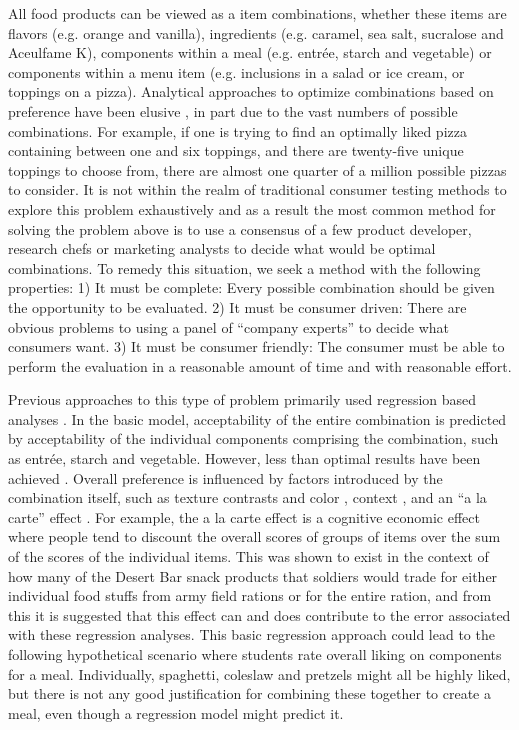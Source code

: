 All food products can be viewed as a item combinations, whether these items are flavors (e.g. orange and vanilla),  ingredients (e.g. caramel, sea salt, sucralose and Aceulfame K), components within a meal (e.g. entr\'{e}e, starch and vegetable) or components within a menu item (e.g. inclusions in a salad or ice cream, or toppings on a pizza).  Analytical approaches to optimize combinations based on preference have been elusive \citep{Eindhoven1959}, in part due to the vast numbers of possible combinations.  For example, if one is trying to find an optimally liked pizza containing between one and six toppings, and there are twenty-five unique toppings to choose from, there are almost one quarter of a million possible pizzas to consider.  It is not within the realm of traditional consumer testing methods to explore this problem exhaustively and as a result the most common method for solving the problem above is to use a consensus of a few product developer, research chefs or marketing analysts to decide what would be optimal combinations.  To remedy this situation, we seek a method with the following properties: 1) It must be complete: Every possible combination should be given the opportunity to be evaluated.  2) It must be consumer driven: There are obvious problems to using a panel of “company experts” to decide what consumers want.  3) It must be consumer friendly: The consumer must be able to perform the evaluation in a reasonable amount of time and with reasonable effort.  

Previous approaches to this type of problem primarily used regression based analyses \citep{Hedderley1995,Moskowitz1983,Turner1988}.  In the basic model, acceptability of the entire combination is predicted by acceptability of the individual components comprising the combination, such as entr\'{e}e, starch and vegetable.  However, less than optimal results have been achieved \citep{Eindhoven1959}.  Overall preference is influenced by factors introduced by the combination itself, such as texture contrasts and color \citep{Eindhoven1959,Pilgrim1961}, context \citep{Marshall2003,Niewind1986}, and an “a la carte” effect \citep{Lawless1994}.  For example, the a la carte effect is a cognitive economic effect where people tend to discount the overall scores of groups of items over the sum of the scores of the individual items.  This was shown to exist in the context of how many of the Desert Bar snack products that soldiers would trade for either individual food stuffs from army field rations or for the entire ration, and from this it is suggested that this effect can and does contribute to the error associated with these regression analyses.  This basic regression approach could lead to the following hypothetical scenario where students rate overall liking on components for a meal.  Individually, spaghetti, coleslaw and pretzels might all be highly liked, but there is not any good justification for combining these together to create a meal, even though a regression model might predict it.  

